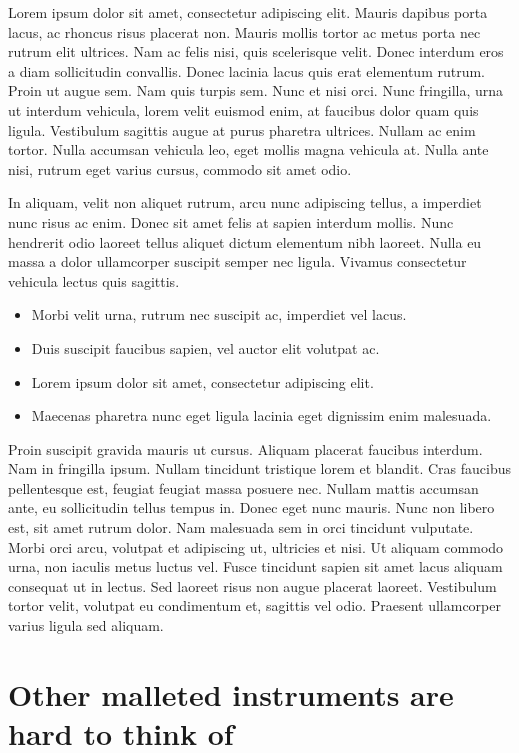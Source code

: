 \documentclass[11pt,oneside,openany]{book}
\begin{document}
Lorem ipsum dolor sit amet, consectetur adipiscing elit. Mauris dapibus porta lacus, ac rhoncus risus placerat non. Mauris mollis tortor ac metus porta nec rutrum elit ultrices. Nam ac felis nisi, quis scelerisque velit. Donec interdum eros a diam sollicitudin convallis. Donec lacinia lacus quis erat elementum rutrum. Proin ut augue sem. Nam quis turpis sem. Nunc et nisi orci. Nunc fringilla, urna ut interdum vehicula, lorem velit euismod enim, at faucibus dolor quam quis ligula. Vestibulum sagittis augue at purus pharetra ultrices. Nullam ac enim tortor. Nulla accumsan vehicula leo, eget mollis magna vehicula at. Nulla ante nisi, rutrum eget varius cursus, commodo sit amet odio.

In aliquam, velit non aliquet rutrum, arcu nunc adipiscing tellus, a imperdiet nunc risus ac enim. Donec sit amet felis at sapien interdum mollis. Nunc hendrerit odio laoreet tellus aliquet dictum elementum nibh laoreet. Nulla eu massa a dolor ullamcorper suscipit semper nec ligula. Vivamus consectetur vehicula lectus quis sagittis.

\begin{itemize}
\item Morbi velit urna, rutrum nec suscipit ac, imperdiet vel lacus.
\item Duis suscipit faucibus sapien, vel auctor elit volutpat ac.
\item Lorem ipsum dolor sit amet, consectetur adipiscing elit.
\item Maecenas pharetra nunc eget ligula lacinia eget dignissim enim malesuada.
\end{itemize}

Proin suscipit gravida mauris ut cursus. Aliquam placerat faucibus interdum. Nam in fringilla ipsum. Nullam tincidunt tristique lorem et blandit. Cras faucibus pellentesque est, feugiat feugiat massa posuere nec. Nullam mattis accumsan ante, eu sollicitudin tellus tempus in. Donec eget nunc mauris. Nunc non libero est, sit amet rutrum dolor. Nam malesuada sem in orci tincidunt vulputate. Morbi orci arcu, volutpat et adipiscing ut, ultricies et nisi. Ut aliquam commodo urna, non iaculis metus luctus vel. Fusce tincidunt sapien sit amet lacus aliquam consequat ut in lectus. Sed laoreet risus non augue placerat laoreet. Vestibulum tortor velit, volutpat eu condimentum et, sagittis vel odio. Praesent ullamcorper varius ligula sed aliquam.

\chapter{Other malleted instruments are hard to think of}\hypertarget{other-malleted-instruments-are-hard-to-think-of}{}\label{other-malleted-instruments-are-hard-to-think-of}
\end{document}
